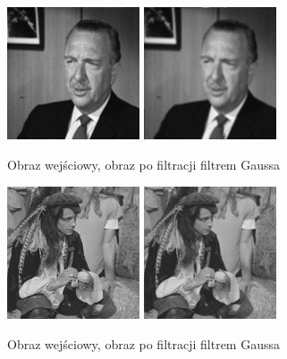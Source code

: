 \documentclass[final,a4paper,openany,12pt]{mwbk}
\begin{document}
\begin{figure}[H]
	\begin{center}
		\includegraphics[width=0.35\textwidth]{gentelman_gray}
		\includegraphics[width=0.35\textwidth]{gentelman_gray_lowpassGauss_result}
	\end{center}
	\caption{Obraz wejściowy, obraz po filtracji filtrem Gaussa}
\end{figure}

\begin{figure}[H]
	\begin{center}
		\includegraphics[width=0.35\textwidth]{pirate_gray}
		\includegraphics[width=0.35\textwidth]{pirate_gray_lowpassGauss_result}
	\end{center}
	\caption{Obraz wejściowy, obraz po filtracji filtrem Gaussa}
\end{figure}
\end{document}
